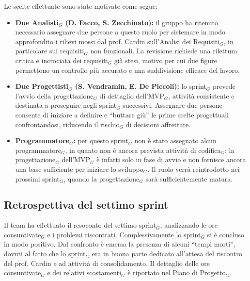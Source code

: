 \documentclass[a4paper, 10pt, colorlinks=true, linkcolor=black, urlcolor=blue, citecolor=blue, hidelinks]{article}
\begin{document}
Le scelte effettuate sono state motivate come segue:
\begin{itemize}
    \item \textbf{Due Analisti$_G$ (D. Facco, S. Zecchinato):} il gruppo ha ritenuto necessario assegnare due persone a questo ruolo per sistemare in modo approfondito i rilievi mossi dal prof. Cardin sull'Analisi dei Requisiti$_G$, in particolare sui requisiti$_G$ non funzionali. La revisione richiede una rilettura critica e incrociata dei requisiti$_G$ già stesi, motivo per cui due figure permettono un controllo più accurato e una suddivisione efficace del lavoro.
    \item \textbf{Due Progettisti$_G$ (S. Vendramin, E. De Piccoli):} lo sprint$_G$ prevede l'avvio della progettazione$_G$ di dettaglio dell'MVP$_G$, attività consistente e destinata a proseguire negli sprint$_G$ successivi. Assegnare due persone consente di iniziare a definire e ``buttare giù'' le prime scelte progettuali confrontandosi, riducendo il rischio$_G$ di decisioni affrettate.
    \item \textbf{Programmatore$_G$:} per questo sprint$_G$ non è stato assegnato alcun programmatore$_G$, in quanto non è ancora prevista attività di codifica$_G$: la progettazione$_G$ dell'MVP$_G$ è infatti solo in fase di avvio e non fornisce ancora una base sufficiente per iniziare lo sviluppo$_G$. Il ruolo verrà reintrodotto nei prossimi sprint$_G$, quando la progettazione$_G$ sarà sufficientemente matura.
\end{itemize}

\subsection{Retrospettiva del settimo sprint}
Il team ha effettuato il resoconto del settimo sprint$_G$, analizzando le ore consuntivate$_G$ e i problemi riscontrati. Complessivamente lo sprint$_G$ si è concluso in modo positivo. Dal confronto è emersa la presenza di alcuni ``tempi morti'', dovuti al fatto che lo sprint$_G$ era in buona parte dedicato all'attesa del riscontro del prof. Cardin e ad attività di consolidamento. Il dettaglio delle ore consuntivate$_G$ e dei relativi scostamenti$_G$ è riportato nel Piano di Progetto$_G$.
\end{document}
